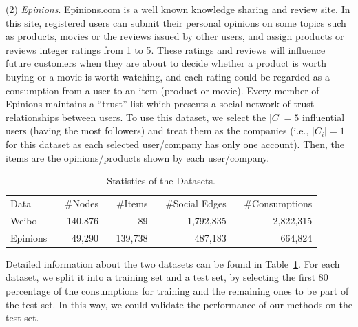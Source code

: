 \documentclass{llncs}
\begin{document}
(2) \emph{Epinions}. Epinions.com is a well known knowledge sharing and review site. In this site, registered users can submit their personal opinions on some topics such as products, movies or the reviews issued by other users, and assign products or reviews integer ratings from 1 to 5. These ratings and reviews will influence future customers when they are about to decide whether a product is worth buying or a movie is worth watching, and each rating could be regarded as a consumption from a user to an item (product or movie). Every member of Epinions maintains a ``trust'' list which presents a social network of trust relationships between users. To use this dataset, we select the $|C|=5$ influential users (having the most followers) and treat them as the companies (i.e., $|C_i| = 1$ for this dataset as each selected user/company has only one account). Then, the items are the opinions/products shown by each user/company.

\begin{table}[thb]
\centering
\caption{Statistics of the Datasets.}\label{table:datasets}
\vspace*{-0.3cm}
\begin{tabular*}{0.75\textwidth}{l|rrrr}
  \cline{1-5}
  Data &~ \#Nodes &~ \#Items &~ \#Social Edges &~ \#Consumptions \\
  \cline{1-5}
  Weibo  &~ 140,876 &~ 89   &~  1,792,835 &~ 2,822,315 \\
  Epinions &~ 49,290 &~ 139,738 &~ 487,183 &~ 664,824 \\
  \cline{1-5}
\end{tabular*}
\end{table}

Detailed information about the two datasets can be found in Table~\ref{table:datasets}. 
For each dataset, we split it into a training set and a test set, by selecting the first 80 percentage of the consumptions for training and the remaining ones to be part of the test set. In this way, we could validate the performance of our methods on the test set. 


\vspace*{-0.35cm}
\end{document}
